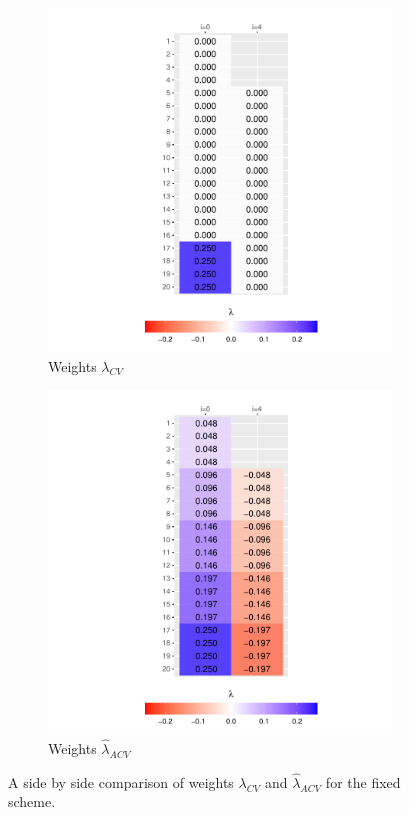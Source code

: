 \documentclass[11pt,dvipsnames]{article}
\begin{document}
\begin{figure}[!htbp]
\centering
\begin{subfigure}{.5\textwidth}
  \centering
  \includegraphics[width=.95\linewidth]{../../Scripts/Illustration/Outputs/Illustration_vn_CV_Article.pdf}
  \caption{Weights $ \lambda_{CV} $}
\end{subfigure}%
\begin{subfigure}{.5\textwidth}
  \centering
  \includegraphics[width=.95\linewidth]{../../Scripts/Illustration/Outputs/Illustration_vn_ACV_Article.pdf}
  \caption{Weights $ \widehat{\lambda}_{ACV} $}
\end{subfigure}
  \caption{A side by side comparison of weights $ \lambda_{CV} $ and $ \widehat{\lambda}_{ACV} $ for the fixed scheme.}
  \label{fig:Illustrationvn} 
\end{figure}
\end{document}

